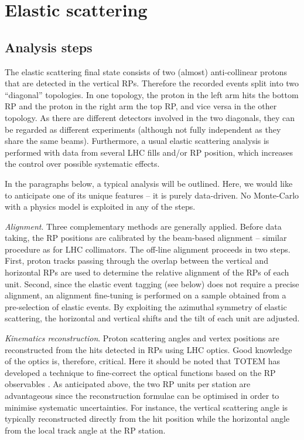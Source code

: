 \documentclass{desyproc}
\begin{document}
\section{Elastic scattering}\label{s:el}

\subsection{Analysis steps}

The elastic scattering final state consists of two (almost) anti-collinear protons that are detected in the vertical RPs. Therefore the recorded events split into two ``diagonal'' topologies. In one topology, the proton in the left arm hits the bottom RP and the proton in the right arm the top RP, and vice versa in the other topology. As there are different detectors involved in the two diagonals, they can be regarded as different experiments (although not fully independent as they share the same beams). Furthermore, a usual elastic scattering analysis is performed with data from several LHC fills and/or RP position, which increases the control over possible systematic effects.

In the paragraphs below, a typical analysis will be outlined. Here, we would like to anticipate one of its unique features -- it is purely data-driven. No Monte-Carlo with a physics model is exploited in any of the steps.

{\em Alignment}. Three complementary methods are generally applied. Before data taking, the RP positions are calibrated by the beam-based alignment -- similar procedure as for LHC collimators. The off-line alignment proceeds in two steps. First, proton tracks passing through the overlap between the vertical and horizontal RPs are used to determine the relative alignment of the RPs of each unit. Second, since the elastic event tagging (see below) does not require a precise alignment, an alignment fine-tuning is performed on a sample obtained from a pre-selection of elastic events. By exploiting the azimuthal symmetry of elastic scattering, the horizontal and vertical shifts and the tilt of each unit are adjusted.

{\em Kinematics reconstruction}. Proton scattering angles and vertex positions are reconstructed from the hits detected in RPs using LHC optics. Good knowledge of the optics is, therefore, critical. Here it should be noted that TOTEM has developed a technique to fine-correct the optical functions based on the RP observables \cite{optics}. As anticipated above, the two RP units per station are advantageous since the reconstruction formulae can be optimised in order to minimise systematic uncertainties. For instance, the vertical scattering angle is typically reconstructed directly from the hit position while the horizontal angle from the local track angle at the RP station.
\end{document}
